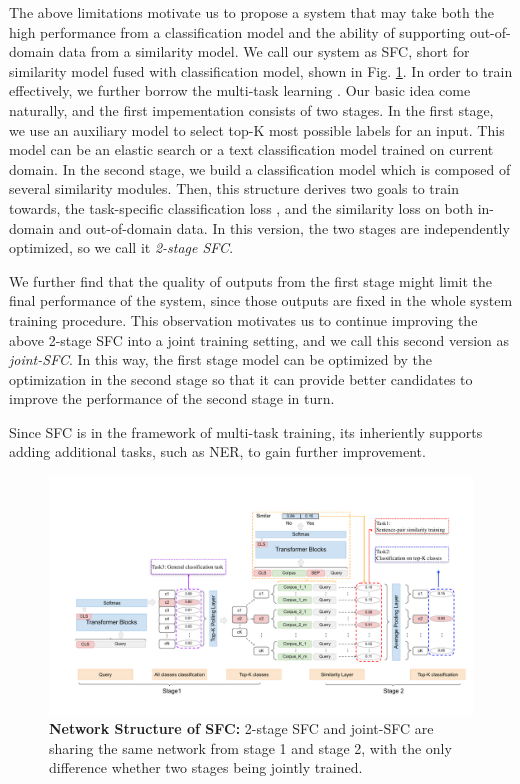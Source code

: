 The above limitations motivate us to propose a system that may take both the high performance from a classification model and the ability of supporting out-of-domain data from a similarity model.
We call our system as SFC, short for similarity model fused with classification model, shown in Fig. \ref{fig:framework}. 
In order to train effectively, we further borrow the multi-task learning \cite{caruana1993multitask,collobert2008unified, liu2019multi}.
Our basic idea come naturally, and the first impementation consists of two stages. 
In the first stage, we use an auxiliary model to select top-K most possible labels for an input. 
This model can be an elastic search \cite{divya2013elasticsearch} or a text classification model trained on current domain. 
In the second stage, we build a classification model which is composed of several similarity modules. 
Then, this structure derives two goals to train towards, the task-specific classification loss , and the similarity loss on both in-domain and out-of-domain data. 
In this version, the two stages are independently optimized, so we call it \emph{2-stage SFC}. 

We further find that the quality of outputs from the first stage might limit the final performance of the system, since those outputs are fixed in the whole system training procedure. 
This observation motivates us to continue improving the above 2-stage SFC into a joint training setting, and we call this second version as \emph{joint-SFC}. 
In this way, the first stage model can be optimized by the optimization in the second stage so that it can provide better candidates to improve the performance of the second stage in turn.

Since SFC is in the framework of multi-task training, its inheriently supports adding additional tasks, such as NER, to gain further improvement.

\begin{figure}[t]
  \begin{centering}
    \includegraphics[scale=0.66]{picture/picture4} 
    \par
  \end{centering}
  \caption{
    \textbf{Network Structure of SFC:} 2-stage SFC and joint-SFC are sharing
    the same network from stage 1 and stage 2, with the only difference
    whether two stages being jointly trained.
  }
  \label{fig:framework}
\end{figure}

